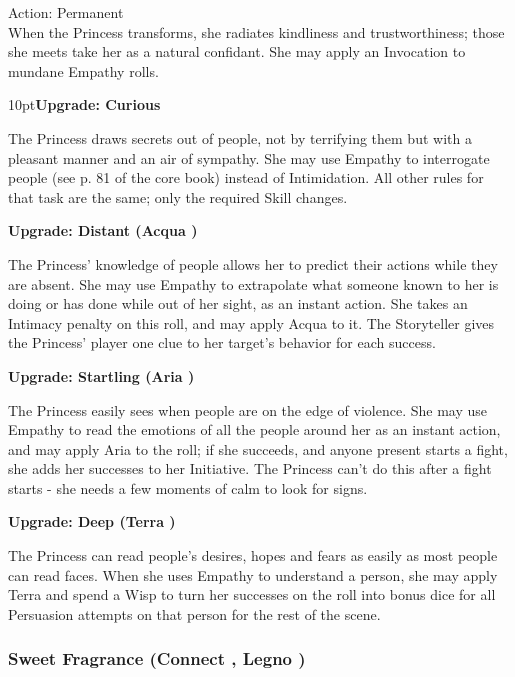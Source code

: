 \noindent Action: Permanent \\

\noindent When the Princess transforms, she radiates kindliness and trustworthiness; those she meets take her as a natural confidant. She may apply an Invocation to mundane Empathy rolls.

\begin{myindentpar}{10pt}\textbf{Upgrade: Curious}

The Princess draws secrets out of people, not by terrifying them but with a pleasant manner and an air of sympathy. She may use Empathy to interrogate people (see p. 81 of the core book) instead of Intimidation. All other rules for that task are the same; only the required Skill changes.

\textbf{Upgrade: Distant (Acqua \textbullet\textbullet)}

The Princess' knowledge of people allows her to predict their actions while they are absent. She may use Empathy to extrapolate what someone known to her is doing or has done while out of her sight, as an instant action. She takes an Intimacy penalty on this roll, and may apply Acqua to it. The Storyteller gives the Princess' player one clue to her target's behavior for each success.

\textbf{Upgrade: Startling (Aria \textbullet\textbullet)}

The Princess easily sees when people are on the edge of violence. She may use Empathy to read the emotions of all the people around her as an instant action, and may apply Aria to the roll; if she succeeds, and anyone present starts a fight, she adds her successes to her Initiative. The Princess can't do this after a fight starts - she needs a few moments of calm to look for signs.

\textbf{Upgrade: Deep (Terra \textbullet\textbullet)}

The Princess can read people's desires, hopes and fears as easily as most people can read faces. When she uses Empathy to understand a person, she may apply Terra and spend a Wisp to turn her successes on the roll into bonus dice for all Persuasion attempts on that person for the rest of the scene.\end{myindentpar}

\subsubsection*{Sweet Fragrance (Connect \textbullet, Legno \textbullet)}

